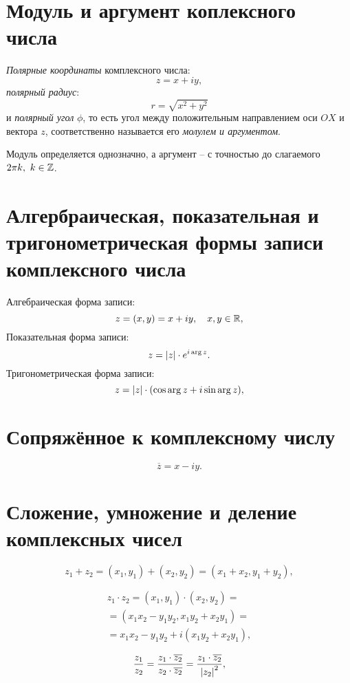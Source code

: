 \section{Модуль и аргумент коплексного числа}

\begin{definition}
  \emph{Полярные координаты} комплексного числа:
  \[
    z = x + iy,
  \]
  \emph{полярный радиус}:
  \[
    r = \sqrt{x^2 + y^2}
  \]
  и \emph{полярный угол} $\phi$, то есть угол между положительным направлением оси $OX$ и вектора $z$, соответственно называется его  \emph{молулем и аргументом}.

  Модуль определяется однозначно, а аргумент -- с точностью до слагаемого $2\pi k, \ k \in \mathbb{Z}$.
\end{definition}

\section{Алгербраическая, показательная и тригонометрическая формы записи комплексного числа}

Алгебраическая форма записи:
\[
	z = (x,y) = x + iy, \quad x,y \in \mathbb{R},
\]
Показательная форма записи:
\[
	z = \left\lvert z\right\rvert \cdot e^{i\arg z}.
\]
Тригонометрическая форма записи:
\[
	z = \left\lvert z\right\rvert \cdot (\cos \arg z + i \sin \arg z),
\]

\newpage

\section{Сопряжённое к комплексному числу}

\[
	\overline{z} = x - iy.
\]

\section{Сложение, умножение и деление комплексных чисел}

\[
  z_1 + z_2 = (x_1, y_1) + (x_2, y_2) = (x_1 + x_2, y_1 + y_2),
\]

\begin{multline*}
  z_1 \cdot z_2 = (x_1, y_1) \cdot (x_2, y_2) = \\
  = (x_1x_2 - y_1y_2, x_1 y_2 + x_2y_1) = \\
  = x_1x_2 - y_1y_2 + i(x_1y_2 + x_2y_1),
\end{multline*}

\[
  \frac{z_1}{z_2} = \frac{z_1 \cdot \overline{z_2}}{z_2 \cdot \overline{z_2}} = \frac{z_1 \cdot \overline{z_2}}{\left\lvert z_2\right\rvert^{2}},
\]

